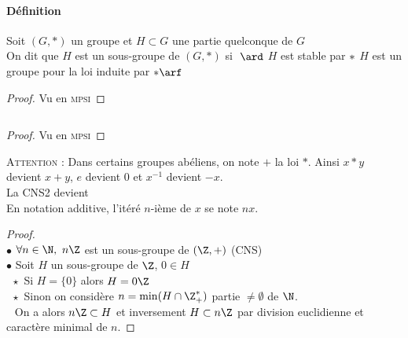 		\paragraph{Définition}
			Soit $(G,\ast)$ un groupe et $H\subset G$ une partie quelconque de $G$ \\
			On dit que $H$ est un sous-groupe de $(G,\ast)$ si $~\ard $ \un $H$ est stable par $\ast \\ $ \deux $H$ est un groupe pour la loi induite par $\ast \arf$ \trait
		\begin{proof}
		Vu en \textsc{mpsi}
		\end{proof}
		${}$ \\ 
		\begin{proof}
		Vu en \textsc{mpsi}
		\end{proof}
		\textsc{Attention} : Dans certains groupes abéliens, on note $+$ la loi $\ast$. Ainsi $x\ast y$ devient $x+y$, $e$ devient $0$ et $x^{-1}$ devient $-x$.\\
		La CNS2 devient \\
		En notation additive, l'itéré $n$-ième de $x$ se note $nx$.
		\vspace*{0.5cm} \\ 
		\begin{proof} ${}$ \\
		$\bullet$ $\forall n\in\N ,~n\Z$ est un sous-groupe de $(\Z,+)$ (CNS)\\
		$\bullet$ Soit $H$ un sous-groupe de $\Z$, $0\in H$\\
		$~~\star $ Si $H=\{0\}$ alors $H=0\Z$\\
		$~~\star$ Sinon on considère $n=\min (H\cap\Z_+^*)$ partie $\neq \emptyset$ de $\N$. \\ $~~$ On a alors $n\Z\subset H$ et inversement $H\subset n\Z$ par division euclidienne et caractère minimal de $n$.
		\end{proof}
